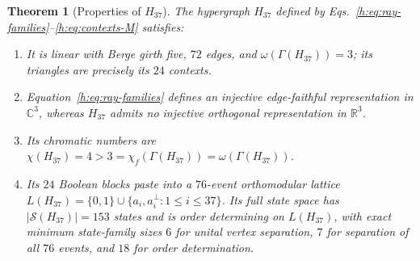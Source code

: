 \documentclass[aps,pra,reprint,superscriptaddress,longbibliography,nofootinbib,floatfix,10pt]{revtex4-2}
\newtheorem{theorem}{Theorem}
\theoremstyle{definition}\newtheorem{definition}[theorem]{Definition}
\theoremstyle{remark}\newtheorem{remark}[theorem]{Remark}
\newcommand{\C}{\mathbb C}\newcommand{\R}{\mathbb R}\newcommand{\Q}{\mathbb Q}
\newcommand{\Sc}{\mathcal S}\newcommand{\Cc}{\mathcal C}
\begin{document}
\begin{theorem}[Properties of $H_{37}$]\label{h:thm:main}
The hypergraph $H_{37}$ defined by Eqs.~\eqref{h:eq:ray-families}--\eqref{h:eq:contexts-M} satisfies:
\begin{enumerate}
\item It is linear with Berge girth five, $72$ edges, and $\omega(\Gamma(H_{37}))=3$; its triangles are precisely its $24$ contexts.
\item Equation~\eqref{h:eq:ray-families} defines an injective edge-faithful representation in $\C^3$, whereas $H_{37}$ admits \emph{no} injective orthogonal representation in $\R^3$.
\item Its chromatic numbers are $\chi(H_{37})=4>3=\chi_f(\Gamma(H_{37}))=\omega(\Gamma(H_{37}))$.
\item Its $24$ Boolean blocks paste into a $76$-event orthomodular lattice $L(H_{37})=\{0,1\}\cup\{a_i,a_i^\perp:1\le i\le 37\}$. Its full state space has $|\Sc(H_{37})|=153$ states and is order determining on $L(H_{37})$, with exact minimum state-family sizes $6$ for unital vertex separation, $7$ for separation of all $76$ events, and $18$ for order determination.
\end{enumerate}
\end{theorem}
\end{document}
